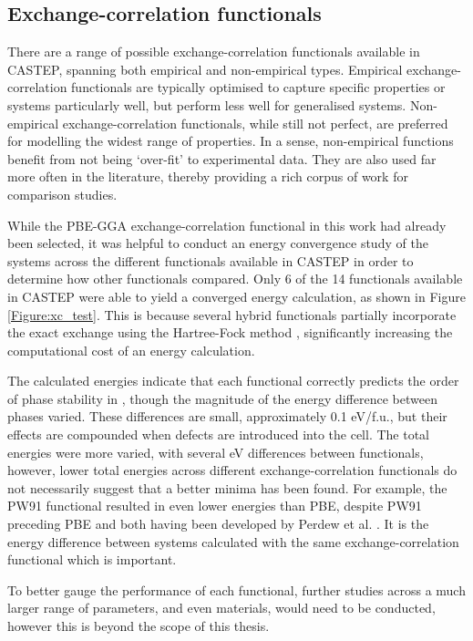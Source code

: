 \subsection{Exchange-correlation functionals}

There are a range of possible exchange-correlation functionals available in CASTEP, spanning both empirical and non-empirical types. Empirical exchange-correlation functionals are typically optimised to capture specific properties or systems particularly well, but perform less well for generalised systems. Non-empirical exchange-correlation functionals, while still not perfect, are preferred for modelling the widest range of properties. In a sense, non-empirical functions benefit from not being `over-fit' to experimental data. They are also used far more often in the literature, thereby providing a rich corpus of work for comparison studies.

While the PBE-GGA exchange-correlation functional in this work had already been selected, it was helpful to conduct an energy convergence study of the systems across the different functionals available in CASTEP in order to determine how other functionals compared. Only 6 of the 14 functionals available in CASTEP were able to yield a converged energy calculation, as shown in Figure \ref{Figure:xc_test}. This is because several hybrid functionals partially incorporate the exact exchange using the Hartree-Fock method \cite{hartree1928wave}, significantly increasing the computational cost of an energy calculation. 

The calculated energies indicate that each functional correctly predicts the order of phase stability in \zirconia , though the magnitude of the energy difference between phases varied. These differences are small, approximately 0.1 eV/f.u., but their effects are compounded when defects are introduced into the cell. The total energies were more varied, with several eV differences between functionals, however, lower total energies across different exchange-correlation functionals do not necessarily suggest that a better minima has been found. For example, the PW91 functional resulted in even lower energies than PBE, despite PW91 preceding PBE and both having been developed by Perdew et al. \cite{perdew1991unified, perdew1992atoms}. It is the energy difference between systems calculated with the same exchange-correlation functional which is important. 

To better gauge the performance of each functional, further studies across a much larger range of parameters, and even materials, would need to be conducted, however this is beyond the scope of this thesis.

